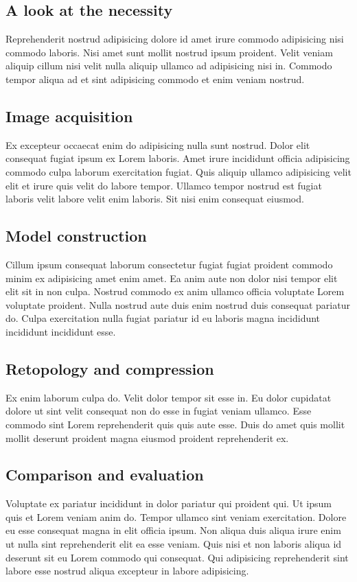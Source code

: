 \documentclass[conference]{IEEEtran}
\begin{document}
\subsection{A look at the necessity}
Reprehenderit nostrud adipisicing dolore id amet irure commodo adipisicing nisi commodo laboris. Nisi amet sunt mollit nostrud ipsum proident. Velit veniam aliquip cillum nisi velit nulla aliquip ullamco ad adipisicing nisi in. Commodo tempor aliqua ad et sint adipisicing commodo et enim veniam nostrud.

\subsection{Image acquisition}
Ex excepteur occaecat enim do adipisicing nulla sunt nostrud. Dolor elit consequat fugiat ipsum ex Lorem laboris. Amet irure incididunt officia adipisicing commodo culpa laborum exercitation fugiat. Quis aliquip ullamco adipisicing velit elit et irure quis velit do labore tempor. Ullamco tempor nostrud est fugiat laboris velit labore velit enim laboris. Sit nisi enim consequat eiusmod.

\subsection{Model construction}
Cillum ipsum consequat laborum consectetur fugiat fugiat proident commodo minim ex adipisicing amet enim amet. Ea anim aute non dolor nisi tempor elit elit sit in non culpa. Nostrud commodo ex anim ullamco officia voluptate Lorem voluptate proident. Nulla nostrud aute duis enim nostrud duis consequat pariatur do. Culpa exercitation nulla fugiat pariatur id eu laboris magna incididunt incididunt incididunt esse.

\subsection{Retopology and compression}
Ex enim laborum culpa do. Velit dolor tempor sit esse in. Eu dolor cupidatat dolore ut sint velit consequat non do esse in fugiat veniam ullamco. Esse commodo sint Lorem reprehenderit quis quis aute esse. Duis do amet quis mollit mollit deserunt proident magna eiusmod proident reprehenderit ex.

\subsection{Comparison and evaluation}
Voluptate ex pariatur incididunt in dolor pariatur qui proident qui. Ut ipsum quis et Lorem veniam anim do. Tempor ullamco sint veniam exercitation. Dolore eu esse consequat magna in elit officia ipsum. Non aliqua duis aliqua irure enim ut nulla sint reprehenderit elit ea esse veniam. Quis nisi et non laboris aliqua id deserunt sit eu Lorem commodo qui consequat. Qui adipisicing reprehenderit sint labore esse nostrud aliqua excepteur in labore adipisicing.
\end{document}
